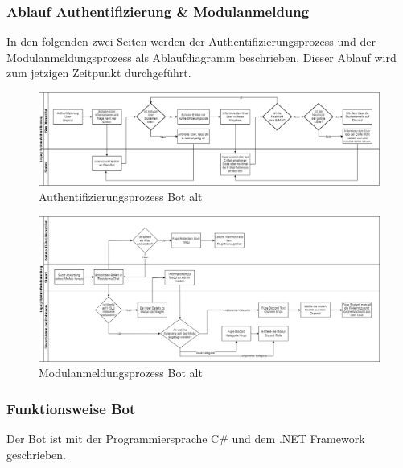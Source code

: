 \documentclass[a4paper, table]{article}
\begin{document}
\subsubsection*{Ablauf Authentifizierung \& Modulanmeldung}
In den folgenden zwei Seiten werden der Authentifizierungsprozess und der Modulanmeldungsprozess als Ablaufdiagramm beschrieben. 
Dieser Ablauf wird zum jetzigen Zeitpunkt durchgeführt.

\begin{landscape}
    \begin{figure}[ht]
        \centering
        \hspace*{-4.1cm}
        \includegraphics[width=1.9\textwidth]{img/Authentifizierungsprozess_Bot_alt.png}
        \caption{Authentifizierungsprozess Bot alt}
        \label{fig:Authentifizierungsprozess_Bot_alt}
    \end{figure}
    \clearpage
    \begin{figure}[ht]
        \centering
        \hspace*{-4.1cm}
        \includegraphics[width=1.9\textwidth]{img/Modulanmeldungsprozess_Bot_alt.png}
        \caption{Modulanmeldungsprozess Bot alt}
        \label{fig:Modulanmeldungsprozess_Bot_alt}
    \end{figure}
\end{landscape}

\subsubsection{Funktionsweise Bot}
Der Bot ist mit der Programmiersprache C\# und dem .NET Framework geschrieben.
\end{document}
